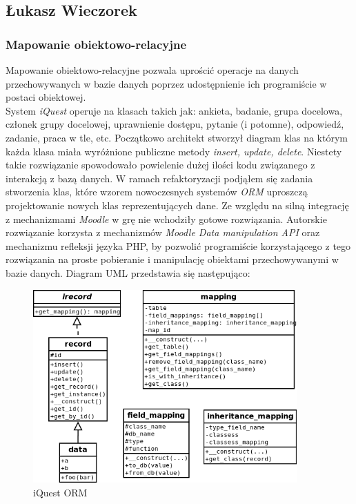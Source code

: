 \subsection{Łukasz Wieczorek}
\subsubsection{Mapowanie obiektowo-relacyjne}
Mapowanie obiektowo-relacyjne pozwala uprościć operacje na danych przechowywanych w bazie danych poprzez udostępnienie ich programiście w postaci obiektowej.\\
System \emph{iQuest} operuje na klasach takich jak: ankieta, badanie, grupa docelowa, członek grupy docelowej, uprawnienie dostępu, pytanie (i potomne), odpowiedź, zadanie, praca w tle, etc. Początkowo architekt stworzył diagram klas na którym każda klasa miała wyróżnione publiczne metody \emph{insert, update, delete}. Niestety takie rozwiązanie spowodowało powielenie dużej ilości kodu związanego z interakcją z bazą danych. W ramach refaktoryzacji podjąłem się zadania stworzenia klas, które wzorem nowoczesnych systemów \emph{ORM} uproszczą projektowanie nowych klas reprezentujących dane. Ze względu na silną integrację z mechanizmami \emph{Moodle} w grę nie wchodziły gotowe rozwiązania. Autorskie rozwiązanie korzysta z mechanizmów \emph{Moodle Data manipulation API} oraz mechanizmu refleksji języka PHP, by pozwolić programiście korzystającego z tego rozwiązania na proste pobieranie i manipulację obiektami przechowywanymi w bazie danych. Diagram UML przedstawia się następująco:
\begin{figure}[H]
\begin{center}
\includegraphics[width=0.9\textwidth]{figures/lw/iquest-orm.png} 
\end{center}
\caption{iQuest ORM}
\label{fig:iquest-orm}
\end{figure}
